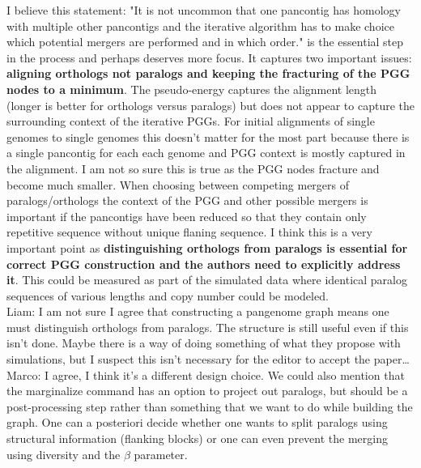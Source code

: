 \documentclass[aps,rmp,onecolumn]{revtex4-1}
\newcommand{\Marco}[1]{{\color{gray}Marco: #1}}
\newcommand{\Liam}[1]{{\color{teal}Liam: #1}}
\begin{document}
I believe this statement: "It is not uncommon that one pancontig has homology with multiple other pancontigs and the iterative algorithm has to make choice which potential mergers are performed and in which order." is the essential step in the process and perhaps deserves more focus. It captures two important issues: \textbf{aligning orthologs not paralogs and keeping the fracturing of the PGG nodes to a minimum}. The pseudo-energy captures the alignment length (longer is better for orthologs versus paralogs) but does not appear to capture the surrounding context of the iterative PGGs. For initial alignments of single genomes to single genomes this doesn't matter for the most part because there is a single pancontig for each each genome and PGG context is mostly captured in the alignment. I am not so sure this is true as the PGG nodes fracture and become much smaller. When choosing between competing mergers of paralogs/orthologs the context of the PGG and other possible mergers is important if the pancontigs have been reduced so that they contain only repetitive sequence without unique flaning sequence. I think this is a very important point as \textbf{distinguishing orthologs from paralogs is essential for correct PGG construction and the authors need to explicitly address it}. This could be measured as part of the simulated data where identical paralog sequences of various lengths and copy number could be modeled.\\
\Liam{I am not sure I agree that constructing a pangenome graph means one must distinguish orthologs from paralogs. The structure is still useful even if this isn't done. Maybe there is a way of doing something of what they propose with simulations, but I suspect this isn't necessary for the editor to accept the paper\ldots}\\
\Marco{I agree, I think it's a different design choice. We could also mention that the marginalize command has an option to project out paralogs, but should be a post-processing step rather than something that we want to do while building the graph. One can a posteriori decide whether one wants to split paralogs using structural information (flanking blocks) or one can even prevent the merging using diversity and the $\beta$ parameter.}
\end{document}
